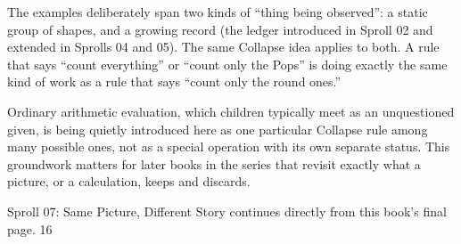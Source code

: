 \documentclass[12pt]{book}
\newcommand{\pagenum}[1]{\vfill{\color{gray!50}\footnotesize #1}}
\begin{document}
\vspace{0.15in}
The examples deliberately span two kinds of ``thing being observed'': a static group of shapes, and a growing record (the ledger introduced in Sproll 02 and extended in Sprolls 04 and 05). The same Collapse idea applies to both. A rule that says ``count everything'' or ``count only the Pops'' is doing exactly the same kind of work as a rule that says ``count only the round ones.''

\vspace{0.15in}
Ordinary arithmetic evaluation, which children typically meet as an unquestioned given, is being quietly introduced here as one particular Collapse rule among many possible ones, not as a special operation with its own separate status. This groundwork matters for later books in the series that revisit exactly what a picture, or a calculation, keeps and discards.

\vspace{0.3in}
{\small Sproll 07: Same Picture, Different Story continues directly from this book's final page.}
\pagenum{16}
\end{document}
